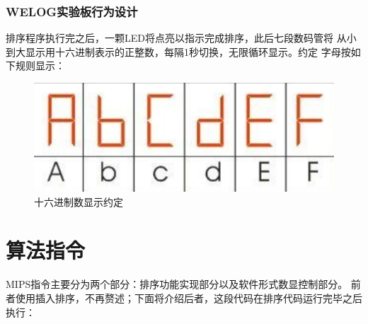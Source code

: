 \documentclass[10pt]{article}
\begin{document}
\subsubsection{WELOG实验板行为设计}
排序程序执行完之后，一颗LED将点亮以指示完成排序，此后七段数码管将
从小到大显示用十六进制表示的正整数，每隔1秒切换，无限循环显示。约定
字母按如下规则显示：
\begin{figure}[H]
    \centering
    \includegraphics[scale=0.6]{abc.png}
    \caption{十六进制数显示约定}
    \end{figure}
\section{算法指令}
MIPS指令主要分为两个部分：排序功能实现部分以及软件形式数显控制部分。
前者使用插入排序，不再赘述；下面将介绍后者，这段代码在排序代码运行完毕之后
执行：
\end{document}
